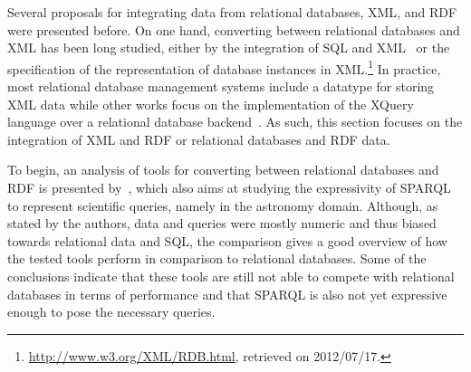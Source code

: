 %
Several proposals for integrating data from relational databases, \ac{XML}, and \ac{RDF} were presented before. 
%
On one hand, converting between relational databases and \ac{XML} has been long studied, either by the integration of
\ac{SQL} and \ac{XML}~\cite{EisenbergMelton:2001aa,EisenbergMelton:2004aa} or the specification of the representation of
database instances in \ac{XML}.\footnote{\url{http://www.w3.org/XML/RDB.html}, retrieved on 2012/07/17.}  
%
In practice, most relational database management systems include a datatype for storing \ac{XML} data while other works
focus on the implementation of the XQuery language over a relational database
backend~\cite{GrustSakrTeubner:2004aa,GrustRittingerTeubner:2008aa}.
%
As such, this
section focuses on the integration of \ac{XML} and \ac{RDF} or relational databases and \ac{RDF} data.

To begin, an analysis of tools for converting between relational databases and \ac{RDF} is presented
by~\citet{GrayGrayOunis:2009aa}, which also aims at studying the expressivity of SPARQL to represent scientific queries,
namely in the astronomy domain.
%
Although, as stated by the authors, data and queries were mostly numeric and thus biased towards relational data and
SQL, the comparison gives a good overview of how the tested tools perform in comparison to relational databases.  
%
Some of the conclusions indicate that these tools are still not able to compete with relational databases in terms of
performance and that SPARQL is also not yet expressive enough to pose the necessary queries.


